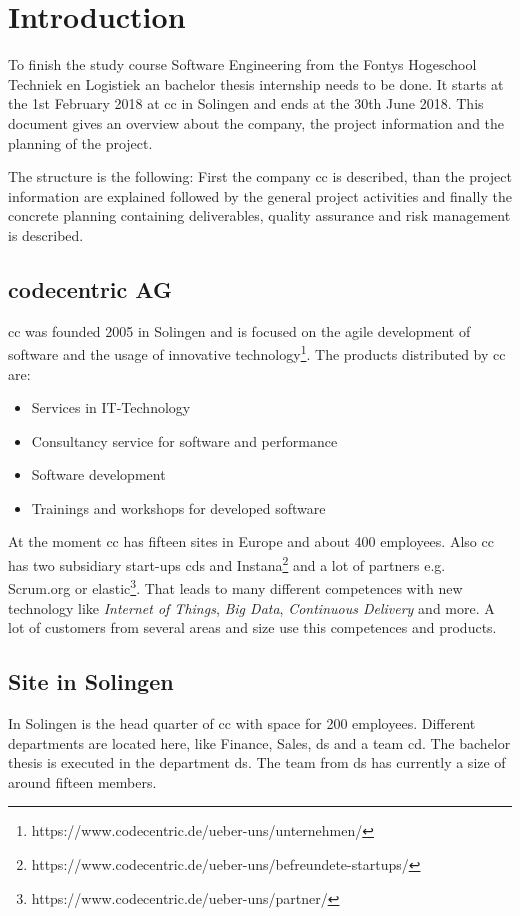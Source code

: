 \chapter{Introduction}
To finish the study course Software Engineering from the Fontys Hogeschool Techniek en Logistiek an bachelor thesis internship needs to be done. It starts at the 1st February 2018 at \gls{cc} in Solingen and ends at the 30th June 2018.
This document gives an overview about the company, the project information and the planning of the project.

The structure is the following: First the company \gls{cc} is described, than the project information are explained followed by the general project activities and finally the concrete planning containing deliverables, quality assurance and risk management is described. 

\section{codecentric AG}
\Gls{cc} was founded 2005 in Solingen and is focused on the agile development of software and the usage of innovative technology\footnote{https://www.codecentric.de/ueber-uns/unternehmen/}. The products distributed by \gls{cc} are: 
\begin{itemize}
	\item Services in \gls{IT}-Technology
	\item Consultancy service for software and performance
	\item Software development
	\item Trainings and workshops for developed software
\end{itemize}
At the moment \gls{cc} has fifteen sites in Europe and about 400 employees. Also \gls{cc} has two subsidiary start-ups \glspl{cd} and Instana\footnote{https://www.codecentric.de/ueber-uns/befreundete-startups/} and a lot of partners e.g. Scrum.org or elastic\footnote{https://www.codecentric.de/ueber-uns/partner/}.
That leads to many different competences with new technology like \textit{Internet of Things}, \textit{Big Data}, \textit{Continuous Delivery} and more.
A lot of customers from several areas and size use this competences and products.

\section{Site in Solingen}
In Solingen is the head quarter of \gls{cc} with space for 200 employees. Different departments are located here, like Finance, Sales, \gls{ds} and a team \gls{cd}.   
The bachelor thesis is executed in the department \gls{ds}. The team from \gls{ds} has currently a size of around fifteen members.

